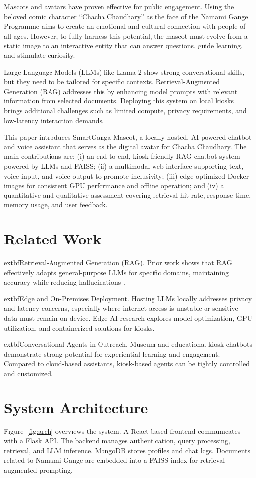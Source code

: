 \documentclass[conference]{IEEEtran}
\begin{document}
Mascots and avatars have proven effective for public engagement. Using the beloved comic character ``Chacha Chaudhary'' as the face of the Namami Gange Programme aims to create an emotional and cultural connection with people of all ages. However, to fully harness this potential, the mascot must evolve from a static image to an interactive entity that can answer questions, guide learning, and stimulate curiosity.

Large Language Models (LLMs) like Llama-2 show strong conversational skills, but they need to be tailored for specific contexts. Retrieval-Augmented Generation (RAG) addresses this by enhancing model prompts with relevant information from selected documents. Deploying this system on local kiosks brings additional challenges such as limited compute, privacy requirements, and low-latency interaction demands.

This paper introduces SmartGanga Mascot, a locally hosted, AI-powered chatbot and voice assistant that serves as the digital avatar for Chacha Chaudhary. The main contributions are: (i) an end-to-end, kiosk-friendly RAG chatbot system powered by LLMs and FAISS; (ii) a multimodal web interface supporting text, voice input, and voice output to promote inclusivity; (iii) edge-optimized Docker images for consistent GPU performance and offline operation; and (iv) a quantitative and qualitative assessment covering retrieval hit-rate, response time, memory usage, and user feedback.


\section{Related Work}
	extbf{Retrieval-Augmented Generation (RAG).} Prior work shows that RAG effectively adapts general-purpose LLMs for specific domains, maintaining accuracy while reducing hallucinations \cite{rag_lewis2020}.

	extbf{Edge and On-Premises Deployment.} Hosting LLMs locally addresses privacy and latency concerns, especially where internet access is unstable or sensitive data must remain on-device. Edge AI research explores model optimization, GPU utilization, and containerized solutions for kiosks.

	extbf{Conversational Agents in Outreach.} Museum and educational kiosk chatbots demonstrate strong potential for experiential learning and engagement. Compared to cloud-based assistants, kiosk-based agents can be tightly controlled and customized.

\section{System Architecture}
Figure~\ref{fig:arch} overviews the system. A React-based frontend communicates with a Flask API. The backend manages authentication, query processing, retrieval, and LLM inference. MongoDB stores profiles and chat logs. Documents related to Namami Gange are embedded into a FAISS index for retrieval-augmented prompting.
\end{document}

